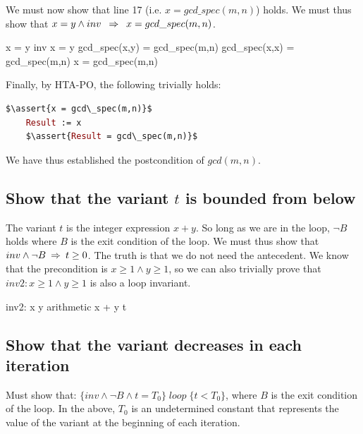 \documentclass[runningheads,12pt]{article}
\def\assert#1{\textcolor{red}{ {\{} {#1} {\}}}}
\begin{document}
We must now show that line 17 (i.e. $x = gcd\_spec(m,n)$) holds. We must thus show that $x = y \land inv \; \; \mathbin\Rightarrow \; \; x = gcd\_spec(m,n)$.
	
\begin{calculation}
	x = y \1\land inv
	x = y \1\land gcd\_spec(x,y) = gcd\_spec(m,n)
	gcd\_spec(x,x) = gcd\_spec(m,n)
	x = gcd\_spec(m,n) \qquad\blacksquare
\end{calculation}

Finally, by HTA-PO, the following trivially holds:
\begin{lstlisting}[language=eiffel]
    $\assert{x = gcd\_spec(m,n)}$
    Result := x
    $\assert{Result = gcd\_spec(m,n)}$
\end{lstlisting} 

We have thus established the postcondition of $gcd(m,n)$.  

\subsection{Show that the variant $t$ is bounded from below}

The variant $t$ is the integer expression $x+y$. So long as we are in the loop, $\lnot B$ holds where $B$ is the exit condition of the loop. We must thus show that $inv \land \lnot B \; \mathbin\Rightarrow \; t \geq 0$. The truth is that we do not need the antecedent. We know that the precondition is $x \geq 1 \land y \geq 1$, so we can also trivially prove that $inv2: x \geq 1 \land y \geq 1$ is also a loop invariant. 

\begin{calculation}
	inv2: x  \land y 
\hint{\limp} {arithmetic}
	x + y 
	t  \qquad\blacksquare
\end{calculation}
%
\subsection{Show that the variant decreases in each iteration}

Must show that: $\{inv \land \lnot B \land t = T_0\}\; loop \;\{t < T_0\}$, where $B$ is the exit condition of the loop. In the above, $T_0$ is an undetermined constant that represents the value of the variant at the beginning of each iteration. 
\end{document}
